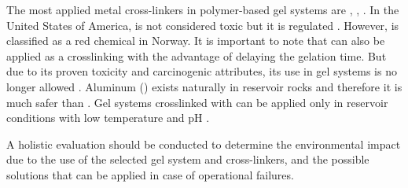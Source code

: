The most applied metal cross-linkers in polymer-based gel systems are , , . In the United States of America,   is not considered toxic but it is regulated \citep{AgencyforToxicSubstancesandDiseaseRegistry2012}. However,  is classified as a red chemical in Norway. It is important to note that  can also be applied as a crosslinking with the advantage of delaying the gelation time. But due to its proven toxicity and carcinogenic attributes, its use in gel systems is no longer allowed \citep{Al-Muntasheri2012}. Aluminum () exists naturally in reservoir rocks and therefore it is much safer than . Gel systems crosslinked with  can be applied only in reservoir conditions with low temperature and pH \citep{Xin2013, Osman2013}.

A holistic evaluation should be conducted to determine the environmental impact due to the use of the selected gel system and cross-linkers, and the possible solutions that can be applied in case of operational failures.
